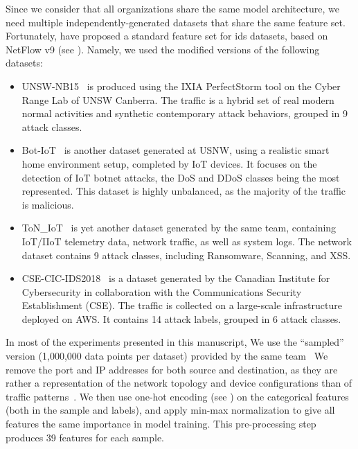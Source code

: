 Since we consider that all organizations share the same model architecture, we need multiple independently-generated datasets that share the same feature set.
Fortunately, \textcite{sarhan_StandardFeatureSet_2022} have proposed a standard feature set for \gls{ids} datasets, based on NetFlow v9 (see ).
Namely, we used the modified versions of the following datasets:
\begin{itemize}
    \item UNSW-NB15~\cite{moustafa_UNSWNB15comprehensivedata_2015} is produced using the IXIA PerfectStorm tool on the Cyber Range Lab of UNSW Canberra.
    The traffic is a hybrid set of real modern normal activities and synthetic contemporary attack behaviors, grouped in 9 attack classes.
    \item Bot-IoT~\cite{koroniotis_developmentrealisticbotnet_2019} is another dataset generated at USNW, using a realistic smart home environment setup, completed by IoT devices.
    It focuses on the detection of IoT botnet attacks, the DoS and DDoS classes being the most represented.
    This dataset is highly unbalanced, as the majority of the traffic is malicious.
    \item ToN\_IoT~\cite{moustafa_FederatedTON_IoTWindows_2020} is yet another dataset generated by the same team, containing IoT/IIoT telemetry data, network traffic, as well as system logs.
    The network dataset contains 9 attack classes, including Ransomware, Scanning, and XSS. %
    \item CSE-CIC-IDS2018~\cite{sharafaldin_GeneratingNewIntrusion_2018} is a dataset generated by the Canadian Institute for Cybersecurity in collaboration with the Communications Security Establishment (CSE).
    The traffic is collected on a large-scale infrastructure deployed on AWS.
    It contains 14 attack labels, grouped in 6 attack classes. %
\end{itemize}

In most of the experiments presented in this manuscript, We use the ``sampled'' version (1,000,000 data points per dataset) provided by the same team~\cite{layeghy_GeneralisabilityMachineLearningbased_2022}
We remove the port and IP addresses for both source and destination, as they are rather a representation of the network topology and device configurations than of traffic patterns~\cite{decarvalhobertoli_Generalizingintrusiondetection_2023}.
We then use one-hot encoding (see ) on the categorical features (both in the sample and labels), and apply min-max normalization to give all features the same importance in model training.
This pre-processing step produces 39 features for each sample.